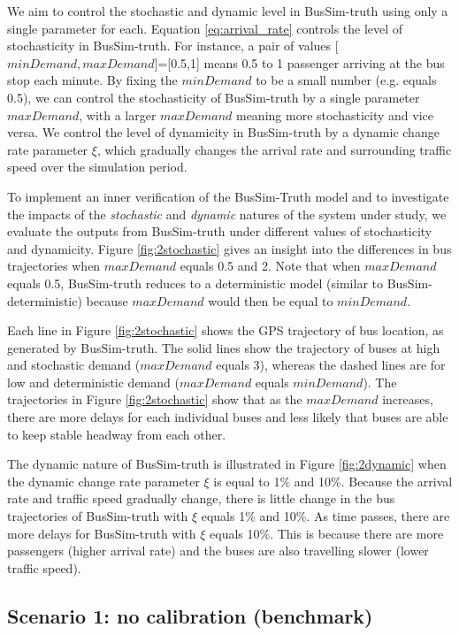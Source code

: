 We aim to control the stochastic and dynamic level in BusSim-truth using only a single parameter for each. Equation \ref{eq:arrival_rate} controls the level of stochasticity in BusSim-truth. For instance, a pair of values [$minDemand, maxDemand$]=[0.5,1] means 0.5 to 1 passenger arriving at the bus stop each minute. By fixing the $minDemand$ to be a small number (e.g. equals 0.5), we can control the stochasticity of BusSim-truth by a single parameter $maxDemand$, with a larger $maxDemand$ meaning more stochasticity and vice versa. We control the level of dynamicity in BusSim-truth by a dynamic change rate parameter $\xi$, which gradually changes the arrival rate and surrounding traffic speed over the simulation period. 

To implement an inner verification of the BusSim-Truth model and to investigate the impacts of the \textit{stochastic} and \textit{dynamic} natures of the system under study, we evaluate the outputs from BusSim-truth under different values of stochasticity and dynamicity. Figure \ref{fig:2stochastic} gives an insight into the differences in bus trajectories when $maxDemand$ equals 0.5 and 2. Note that when $maxDemand$ equals 0.5, BusSim-truth reduces to a deterministic model (similar to BusSim-deterministic) because $maxDemand$ would then be equal to $minDemand$. 

Each line in Figure \ref{fig:2stochastic} shows the GPS trajectory of bus location, as generated by BusSim-truth. The solid lines show the trajectory of buses at high and stochastic demand ($maxDemand$ equals 3), whereas the dashed lines are for low and deterministic demand ($maxDemand$ equals $minDemand$). The trajectories in Figure \ref{fig:2stochastic} show that as the $maxDemand$ increases, there are more delays for each individual buses and less likely that buses are able to keep stable headway from each other. 

The dynamic nature of BusSim-truth is illustrated in 
Figure \ref{fig:2dynamic} when the dynamic change rate parameter $\xi$ is equal to 1\% and 10\%. Because the arrival rate and traffic speed gradually change, there is little change in the bus trajectories of BusSim-truth with $\xi$ equals 1\% and 10\%. As time passes, there are more delays for BusSim-truth with $\xi$ equals 10\%. This is because there are more passengers (higher arrival rate) and the buses are also travelling slower (lower traffic speed).

\subsection{Scenario 1: no calibration (benchmark)} 


